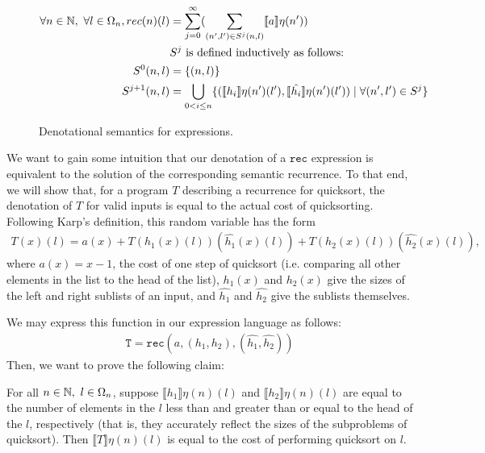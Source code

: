 \begin{figure}
\begin{align*}
  \forall n \in \N, \ 
    \forall l \in \Omega_n, 
    rec(n)(l) &= \sum_{j=0}^{\infty}(\sum_{(n',l') \in S^j(n,l)} \llbracket a \rrbracket\eta(n')) \\
    &S^j \text{ is defined inductively as follows:} \\
    S^0(n,l) &= \{(n, l)\} \\
    S^{j+1}(n,l) &= \bigcup_{0<i \leq n}\{(\llbracket h_i \rrbracket\eta(n')(l') , \llbracket \hat{h_i} \rrbracket\eta(n')(l')) \mid 
    \forall (n', l') \in S^j \}
 \end{align*}
 \caption{Denotational semantics for expressions.}
 \end{figure}

We want to gain some intuition that our denotation of a $\texttt{rec}$ expression is equivalent to the solution of
the corresponding semantic recurrence. To that end, we will show that, for a program $T$ describing a recurrence for 
quicksort, the denotation of $T$ for valid inputs is equal to the actual cost of quicksorting. 
 Following Karp's definition, this random variable has the form 
\begin{align*}
T(x)(l) = a(x) + T(h_1(x)(l))(\hat{h_1}(x)(l)) + T(h_2(x)(l))(\hat{h_2}(x)(l)), 
\end{align*}
where $a(x) = x-1$, the cost of one step of quicksort (i.e. comparing all other elements
in the list to the head of the list), $h_1(x)$ and $h_2(x)$ give the sizes of the left and right sublists of an input, and
$\hat{h_1}$ and $\hat{h_2}$ give the sublists themselves. 

We may express this function in our expression language
as follows:
\begin{align*}
\texttt{T} = \texttt{rec}(a, (h_1, h_2), (\hat{h_1}, \hat{h_2}))
\end{align*}
Then, we want to prove the following claim:
\begin{thm}
For all $n \in \mathbb{N}, \ l \in \Omega_n$, suppose $\llbracket h_1 \rrbracket\eta (n)(l)$ and $\llbracket h_2 \rrbracket\eta (n)(l)$
are equal to the number of elements in the $l$ less than and greater than or equal to the head of the $l$, respectively (that is,
they accurately reflect the sizes of the subproblems of quicksort). Then $\llbracket T \rrbracket\eta (n)(l)$ is equal to the cost
of performing quicksort on $l$. 
\end{thm} 

